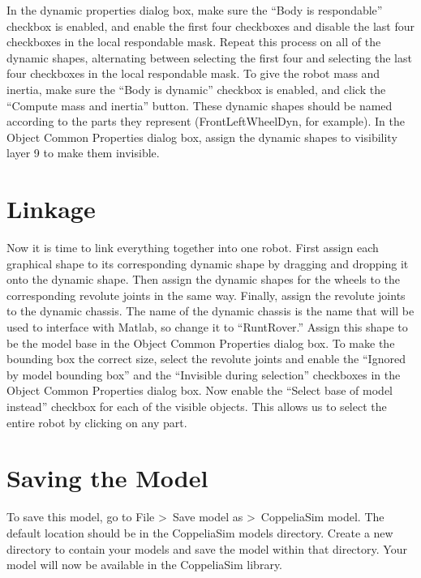 In the dynamic properties dialog box, make sure the ``Body is respondable'' checkbox is enabled, and enable the first four checkboxes and disable the last four checkboxes in the local respondable mask. Repeat this process on all of the dynamic shapes, alternating between selecting the first four and selecting the last four checkboxes in the local respondable mask. To give the robot mass and inertia, make sure the ``Body is dynamic'' checkbox is enabled, and click the ``Compute mass and inertia'' button. These dynamic shapes should be named according to the parts they represent (FrontLeftWheelDyn, for example). In the Object Common Properties dialog box, assign the dynamic shapes to visibility layer 9 to make them invisible.

\section{Linkage}
Now it is time to link everything together into one robot. First assign each graphical shape to its corresponding dynamic shape by dragging and dropping it onto the dynamic shape. Then assign the dynamic shapes for the wheels to the corresponding revolute joints in the same way. Finally, assign the revolute joints to the dynamic chassis. The name of the dynamic chassis is the name that will be used to interface with Matlab, so change it to ``RuntRover.'' Assign this shape to be the model base in the Object Common Properties dialog box. To make the bounding box the correct size, select the revolute joints and enable the ``Ignored by model bounding box'' and the ``Invisible during selection'' checkboxes in the Object Common Properties dialog box. Now enable the ``Select base of model instead'' checkbox for each of the visible objects. This allows us to select the entire robot by clicking on any part.

\section{Saving the Model}
To save this model, go to File \textgreater \ Save model as \textgreater \ CoppeliaSim model. The default location should be in the CoppeliaSim models directory. Create a new directory to contain your models and save the model within that directory. Your model will now be available in the CoppeliaSim library.


